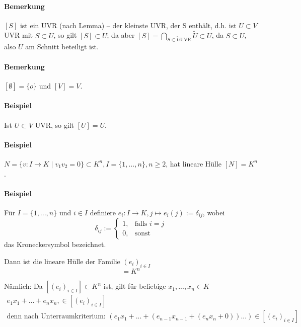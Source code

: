 \paragraph{Bemerkung}
    $[S]$ ist ein UVR (nach Lemma) -- der \glqq kleinste\grqq{} UVR, der S enthält, d.h. ist $U\subset V$ UVR mit $S\subset U$, so gilt $[S]\subset U$; da aber $[S] = \bigcap_{S\subset \tilde{U}  \text{UVR}}\tilde{U}\subset U$,
    da $S\subset U$, also $U$ am Schnitt beteiligt ist.

\paragraph{Bemerkung}
	$[\emptyset ] = \{o\}$ und $[V] = V$.

\paragraph{Beispiel}
	Ist $U\subset V$ UVR, so gilt $[U] = U$.

\paragraph{Beispiel}
	$N=\{v:I\to K\mid v_1v_2=0\} \subset K^n,I=\{1,...,n\},n\geq 2$, hat lineare Hülle $[N]=K^n$.

\paragraph{Beispiel}
	Für $I=\{1,...,n\}$ und $i\in I$ definiere
	$e_i:I\to K , j\mapsto e_i(j):= \delta_{ij}$, wobei 
	\begin{equation*}
		\delta_{ij} :=
		\begin{cases}
			1,& \text{falls }i=j\\
			0,& \text{sonst}
		\end{cases}
	\end{equation*}
	das Kroneckersymbol bezeichnet.
	
	Dann ist die lineare Hülle der Familie $(e_i)_{i\in I}$
	\begin{equation*}
		[(e_i)_{i\in I}] = K^n
	\end{equation*}
	
	Nämlich: Da $[(e_i)_{i\in I}]\subset K^n$ ist, gilt für beliebige $x_1,...,x_n\in K$
	\begin{gather*}
		e_1x_1+...+e_nx_n,\in [(e_i)_{i\in I}]\\ \text{denn nach Unterraumkriterium: } (e_1x_1+...+(e_{n-1}x_{n-1}+(e_nx_n + 0))...) \in [(e_i)_{i\in I}]
	\end{gather*}
	
